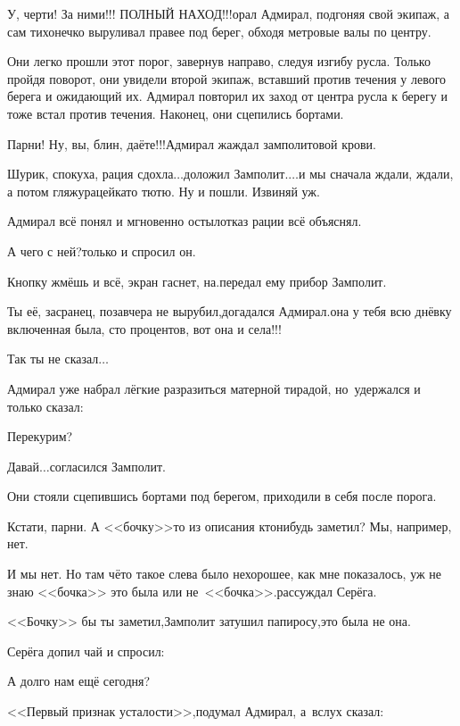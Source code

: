 \diagdash У, черти! За ними!!! {\large ПОЛНЫЙ НАХОД!!!}\mdash орал Адмирал, подгоняя свой экипаж, а сам тихонечко выруливал правее под берег, обходя метровые валы по центру. 

Они легко прошли этот порог, завернув направо, следуя изгибу русла. Только пройдя поворот, они увидели второй экипаж, вставший против течения у левого берега и ожидающий их. Адмирал повторил их заход от центра русла к берегу и тоже встал против течения. Наконец, они сцепились бортами.

\diagdash Парни! Ну, вы, блин, даёте!!!\mdash Адмирал жаждал замполитовой крови.

\diagdash Шурик, спокуха, рация сдохла$\ldots$\mdash доложил Замполит.\mdash$\ldots$и мы сначала ждали, ждали, а потом гляжу\mdash рацейка\sdash то тю\sdash тю. Ну и пошли. Извиняй уж.

Адмирал всё понял и мгновенно остыл\mdash отказ рации всё объяснял.

\diagdash А чего с ней?\mdash только и спросил он.

\diagdash Кнопку жмёшь и всё, экран гаснет, на.\mdash передал ему прибор Замполит.

\diagdash Ты её, засранец, позавчера не вырубил,\mdash догадался Адмирал.\mdash она у тебя всю днёвку включенная была, сто процентов, вот она и села!!!

\diagdash Так ты не сказал$\ldots$

Адмирал уже набрал лёгкие разразиться матерной тирадой, но~удержался и только сказал:

\diagdash Перекурим?

\diagdash Давай$\ldots$\mdash согласился Замполит.

Они стояли сцепившись бортами под берегом, приходили в себя после порога. 

\diagdash Кстати, парни. А <<бочку>>\sdash то из описания кто\sdash нибудь заметил? Мы, например, нет. 

\diagdash И мы нет. Но там чё\sdash то такое слева было нехорошее, как мне показалось, уж не знаю <<бочка>> это была или не~<<бочка>>.\mdash рассуждал Серёга.

\diagdash <<Бочку>> бы ты заметил,\mdash Замполит затушил папиросу,\mdash это была не она.

Серёга допил чай и спросил:

\diagdash А долго нам ещё сегодня?

<<Первый признак усталости>>,\mdash подумал Адмирал, а~вслух сказал:

